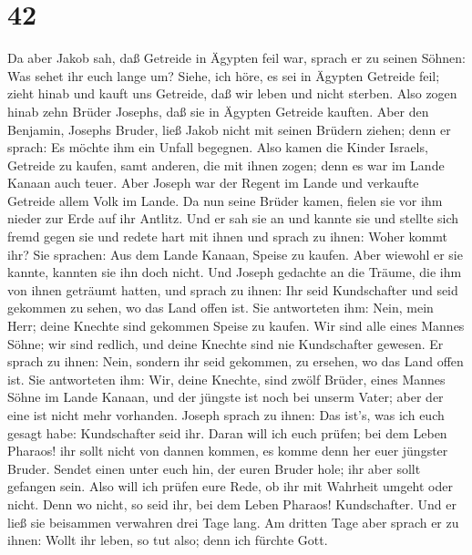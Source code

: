 \hypertarget{section-41}{%
\section{42}\label{section-41}}

 Da aber Jakob sah, daß Getreide in Ägypten feil war, sprach
er zu seinen Söhnen: Was sehet ihr euch lange um?  Siehe,
ich höre, es sei in Ägypten Getreide feil; zieht hinab und kauft uns
Getreide, daß wir leben und nicht sterben.  Also zogen hinab
zehn Brüder Josephs, daß sie in Ägypten Getreide kauften. 
Aber den Benjamin, Josephs Bruder, ließ Jakob nicht mit seinen Brüdern
ziehen; denn er sprach: Es möchte ihm ein Unfall begegnen. 
Also kamen die Kinder Israels, Getreide zu kaufen, samt anderen, die mit
ihnen zogen; denn es war im Lande Kanaan auch teuer.  Aber
Joseph war der Regent im Lande und verkaufte Getreide allem Volk im
Lande. Da nun seine Brüder kamen, fielen sie vor ihm nieder zur Erde auf
ihr Antlitz.  Und er sah sie an und kannte sie und stellte
sich fremd gegen sie und redete hart mit ihnen und sprach zu ihnen:
Woher kommt ihr? Sie sprachen: Aus dem Lande Kanaan, Speise zu kaufen.
 Aber wiewohl er sie kannte, kannten sie ihn doch nicht.
 Und Joseph gedachte an die Träume, die ihm von ihnen
geträumt hatten, und sprach zu ihnen: Ihr seid Kundschafter und seid
gekommen zu sehen, wo das Land offen ist.  Sie antworteten
ihm: Nein, mein Herr; deine Knechte sind gekommen Speise zu kaufen.
 Wir sind alle eines Mannes Söhne; wir sind redlich, und
deine Knechte sind nie Kundschafter gewesen.  Er sprach zu
ihnen: Nein, sondern ihr seid gekommen, zu ersehen, wo das Land offen
ist.  Sie antworteten ihm: Wir, deine Knechte, sind zwölf
Brüder, eines Mannes Söhne im Lande Kanaan, und der jüngste ist noch bei
unserm Vater; aber der eine ist nicht mehr vorhanden. 
Joseph sprach zu ihnen: Das ist's, was ich euch gesagt habe:
Kundschafter seid ihr.  Daran will ich euch prüfen; bei dem
Leben Pharaos! ihr sollt nicht von dannen kommen, es komme denn her euer
jüngster Bruder.  Sendet einen unter euch hin, der euren
Bruder hole; ihr aber sollt gefangen sein. Also will ich prüfen eure
Rede, ob ihr mit Wahrheit umgeht oder nicht. Denn wo nicht, so seid ihr,
bei dem Leben Pharaos! Kundschafter.  Und er ließ sie
beisammen verwahren drei Tage lang.  Am dritten Tage aber
sprach er zu ihnen: Wollt ihr leben, so tut also; denn ich fürchte Gott.
